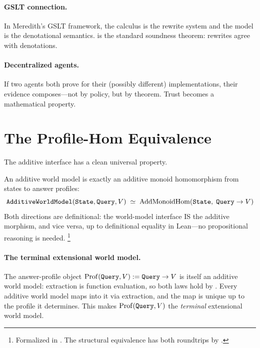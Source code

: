 \documentclass[11pt,openany]{report}
\begin{document}
\paragraph{GSLT connection.}
In Meredith's GSLT framework, the calculus is the rewrite system
and the model is the denotational semantics.
 is the standard soundness theorem: rewrites
agree with denotations.

\paragraph{Decentralized agents.}
If two agents both prove  for their (possibly
different) implementations, their evidence composes---not by
policy, but by theorem.  Trust becomes a mathematical property.


\section{The Profile-Hom Equivalence}
\label{sec:profile-hom}

The additive interface has a clean universal property.

\begin{theorem}
\label{thm:universal-property}
An additive world model is exactly an additive monoid homomorphism
from states to answer profiles:
\[
  \texttt{AdditiveWorldModel}(\texttt{State}, \texttt{Query}, V)
  \;\simeq\;
  \mathrm{AddMonoidHom}(\texttt{State},\; \texttt{Query} \to V)
\]
Both directions are definitional: the world-model interface IS the
additive morphism, and vice versa, up to definitional equality in
Lean---no propositional reasoning is needed.%
\footnote{Formalized in .
The structural equivalence  has both
roundtrips by .}
\end{theorem}

\paragraph{The terminal extensional world model.}
The answer-profile object $\mathrm{Prof}(\texttt{Query}, V) :=
\texttt{Query} \to V$ is itself an additive world model: extraction is
function evaluation, so both laws hold by .  Every additive
world model maps into it via extraction, and the map is unique up to
the profile it determines.  This makes $\mathrm{Prof}(\texttt{Query}, V)$
the \emph{terminal} extensional world model.
\end{document}
